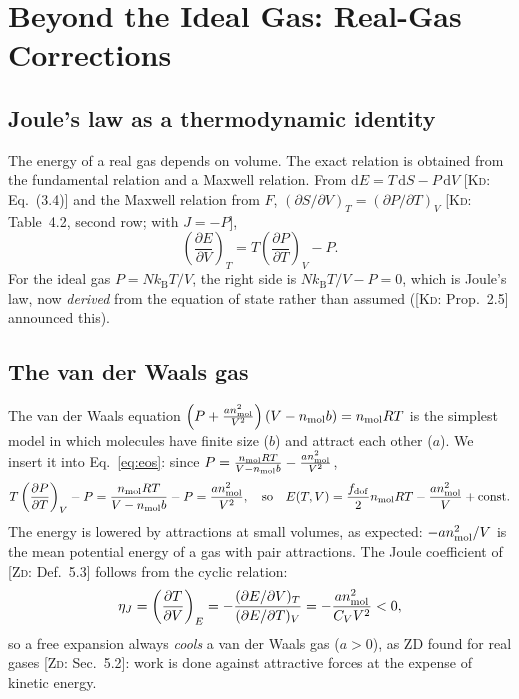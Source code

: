 \documentclass[11pt,a4paper]{report}
\theoremstyle{definition}
\theoremstyle{plain}
\newcommand{\KD}[1]{[\textsc{Kd}: #1]}   %
\newcommand{\ZD}[1]{[\textsc{Zd}: #1]}   %
\newcommand{\kB}{k_{\mathrm{B}}}
\newcommand{\dd}{\mathrm{d}}
\begin{document}
\section{Beyond the Ideal Gas: Real-Gas Corrections}
\label{sec:real}

\subsection{Joule's law as a thermodynamic identity}

The energy of a real gas depends on volume. The exact relation is obtained from the fundamental relation and a Maxwell relation. From $\dd E=T\,\dd S-P\,\dd V$ \KD{Eq.~(3.4)} and the Maxwell relation from $F$, $(\partial S/\partial V)_T=(\partial P/\partial T)_V$ \KD{Table~4.2, second row; with $J=-P$},
\begin{equation}
\left(\frac{\partial E}{\partial V}\right)_T=T\left(\frac{\partial P}{\partial T}\right)_V-P .
\label{eq:eos}
\end{equation}
For the ideal gas $P=N\kB T/V$, the right side is $N\kB T/V-P=0$, which is Joule's law, now \emph{derived} from the equation of state rather than assumed (\KD{Prop.~2.5} announced this).

\subsection{The van der Waals gas}

The van der Waals equation $\left(P+\frac{an_{\rm mol}^2}{V^2}\right)(V-n_{\rm mol}b)=n_{\rm mol}RT$ is the simplest model in which molecules have finite size ($b$) and attract each other ($a$). We insert it into Eq.~\eqref{eq:eos}: since $P=\frac{n_{\rm mol}RT}{V-n_{\rm mol}b}-\frac{an_{\rm mol}^2}{V^2}$,
\[
T\left(\frac{\partial P}{\partial T}\right)_V-P=\frac{n_{\rm mol}RT}{V-n_{\rm mol}b}-P=\frac{an_{\rm mol}^2}{V^2},
\quad\text{so}\quad E(T,V)=\frac{f_{\rm dof}}{2}n_{\rm mol}RT-\frac{an_{\rm mol}^2}{V}+\text{const}.
\]
The energy is lowered by attractions at small volumes, as expected: $-an_{\rm mol}^2/V$ is the mean potential energy of a gas with pair attractions. The Joule coefficient of \ZD{Def.~5.3} follows from the cyclic relation:
\begin{equation}
\eta_J=\left(\frac{\partial T}{\partial V}\right)_E=-\frac{(\partial E/\partial V)_T}{(\partial E/\partial T)_V}=-\frac{an_{\rm mol}^2}{C_VV^2}<0,
\end{equation}
so a free expansion always \emph{cools} a van der Waals gas ($a>0$), as ZD found for real gases \ZD{Sec.~5.2}: work is done against attractive forces at the expense of kinetic energy.
\end{document}
